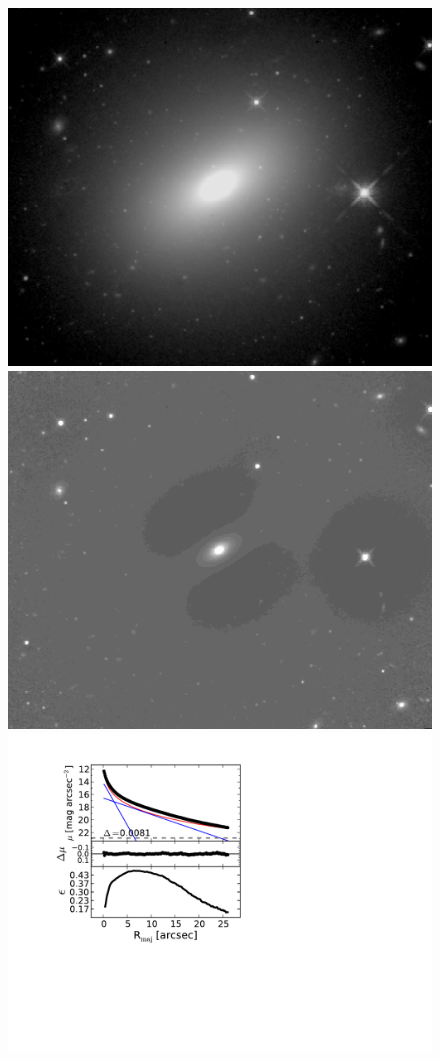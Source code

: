 \documentclass[useAMS,usenatbib,article]{mn2e}
\begin{document}
\begin{figure}
\begin{center}
\includegraphics[width=0.49\columnwidth]{images/mrk1216_image.jpeg}
\includegraphics[width=0.49\columnwidth]{images/mrk1216_unsharp.jpeg} \\
\includegraphics[width=1.05\columnwidth]{images/mrk1216_decomposition.pdf}
\caption{}
\label{fig:m1216}
\end{center}
\end{figure}
\end{document}
